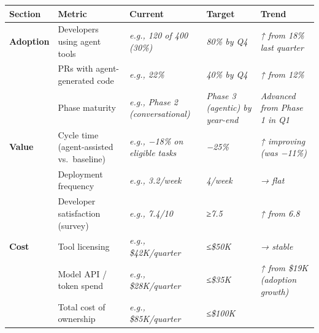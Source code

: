 \documentclass[
  a4paper,
  DIV=11,
  numbers=noendperiod]{scrreprt}
\newcounter{none} %
\begin{document}
{\def\LTcaptype{none} %
\begin{longtable}[]{@{}
  >{\raggedright\arraybackslash}p{}
  >{\raggedright\arraybackslash}p{}
  >{\raggedright\arraybackslash}p{}
  >{\raggedright\arraybackslash}p{}
  >{\raggedright\arraybackslash}p{}@{}}
\toprule\noalign{}
\begin{minipage}[b]{\linewidth}\raggedright
Section
\end{minipage} & \begin{minipage}[b]{\linewidth}\raggedright
Metric
\end{minipage} & \begin{minipage}[b]{\linewidth}\raggedright
Current
\end{minipage} & \begin{minipage}[b]{\linewidth}\raggedright
Target
\end{minipage} & \begin{minipage}[b]{\linewidth}\raggedright
Trend
\end{minipage} \\
\midrule\noalign{}
\endhead
\bottomrule\noalign{}
\endlastfoot
\textbf{Adoption} & Developers using agent tools & \emph{e.g., 120 of
400 (30\%)} & \emph{80\% by Q4} & \emph{↑ from 18\% last quarter} \\
& PRs with agent-generated code & \emph{e.g., 22\%} & \emph{40\% by Q4}
& \emph{↑ from 12\%} \\
& Phase maturity & \emph{e.g., Phase 2 (conversational)} & \emph{Phase 3
(agentic) by year-end} & \emph{Advanced from Phase 1 in Q1} \\
\textbf{Value} & Cycle time (agent-assisted vs.~baseline) & \emph{e.g.,
−18\% on eligible tasks} & \emph{−25\%} & \emph{↑ improving (was
−11\%)} \\
& Deployment frequency & \emph{e.g., 3.2/week} & \emph{4/week} & \emph{→
flat} \\
& Developer satisfaction (survey) & \emph{e.g., 7.4/10} & \emph{≥7.5} &
\emph{↑ from 6.8} \\
\textbf{Cost} & Tool licensing & \emph{e.g., \$42K/quarter} &
\emph{≤\$50K} & \emph{→ stable} \\
& Model API / token spend & \emph{e.g., \$28K/quarter} & \emph{≤\$35K} &
\emph{↑ from \$19K (adoption growth)} \\
& Total cost of ownership & \emph{e.g., \$85K/quarter} & \emph{≤\$100K}

\end{longtable}}
\end{document}
